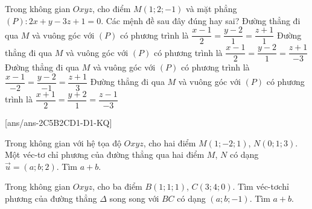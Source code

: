 \begin{ex}%
	Trong không gian $Oxyz$, cho điểm $M(1;2;-1)$ và mặt phẳng $(P)\colon 2x+y-3z+1=0$. Các mệnh đề sau đây đúng hay sai?
	\choiceTF
	{ Đường thẳng đi qua $M$ và vuông góc với $(P)$ có phương trình là $\dfrac{x-1}{2}=\dfrac{y-2}{1}=\dfrac{z+1}{1}$}
	{\True  Đường thẳng đi qua $M$ và vuông góc với $(P)$ có phương trình là $\dfrac{x-1}{2}=\dfrac{y-2}{1}=\dfrac{z+1}{-3}$}
	{\True  Đường thẳng đi qua $M$ và vuông góc với ${(P)}$ có phương trình là $\dfrac{x-1}{-2}=\dfrac{y-2}{-1}=\dfrac{z+1}{3}$}
	{Đường thẳng đi qua $M$ và vuông góc với $(P)$ có phương trình là $\dfrac{x+1}{2}=\dfrac{y+2}{1}=\dfrac{z-1}{-3}$}
\end{ex}


[ans/ans-2C5B2CD1-D1-KQ]
\TNSA
\begin{ex}%
	Trong không gian với hệ tọa độ $Oxyz$, cho hai điểm $M\left( 1;-2;1 \right)$, $N\left( 0;1;3 \right)$. Một véc-tơ chỉ phương của đường thẳng qua hai điểm $M$, $N$ có dạng $\overrightarrow{u}=(a;b;2)$. Tìm $a+b.$
\end{ex}
\begin{ex}%
	Trong không gian $Oxyz$, cho ba điểm $B\left( 1;1;1 \right)$, $C\left( 3;4;0 \right)$. Tìm véc-tơchỉ phương của đường thẳng $\Delta $ song song với $BC$ có dạng $(a;b;-1)$. Tìm $a+b$.
\end{ex}

